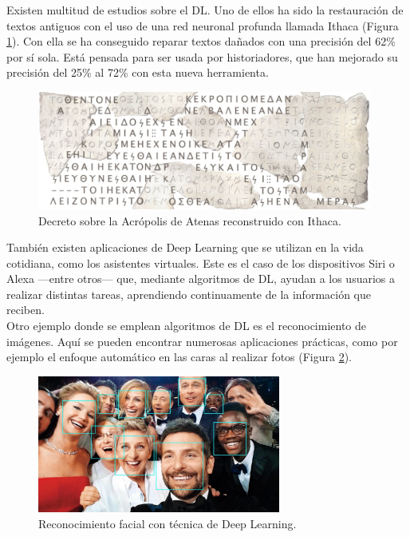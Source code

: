 Existen multitud de estudios sobre el DL. Uno de ellos ha sido la restauración de textos antiguos con el uso de una red neuronal profunda llamada Ithaca \cite{assael22} (Figura \ref{fig:textos}). Con ella se ha conseguido reparar textos dañados con una precisión del 62\% por sí sola. Está pensada para ser usada por historiadores, que han mejorado su precisión del 25\% al 72\% con esta nueva herramienta.\\
\begin{figure} [h!]
  \begin{center}
    \includegraphics[width=11cm]{figs/textos}
  \end{center}
  \caption{Decreto sobre la Acrópolis de Atenas reconstruido con Ithaca.}
  \label{fig:textos}
\end{figure}

También existen aplicaciones de Deep Learning que se utilizan en la vida cotidiana, como los asistentes virtuales.  Este es el caso de los dispositivos Siri o Alexa ---entre otros--- que, mediante algoritmos de DL, ayudan a los usuarios a realizar distintas tareas, aprendiendo continuamente de la información que reciben.\\

Otro ejemplo donde se emplean algoritmos de DL es el reconocimiento de imágenes. Aquí se pueden encontrar numerosas aplicaciones prácticas, como por ejemplo el enfoque automático en las caras al realizar fotos (Figura \ref{fig:caras}).\\
\begin{figure} [h!]
  \begin{center}
    \includegraphics[width=8cm]{figs/caras}
  \end{center}
  \caption{Reconocimiento facial con técnica de Deep Learning.}
  \label{fig:caras}
\end{figure}

